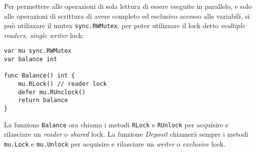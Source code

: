 Per permettere alle operazioni di sola lettura di essere eseguite in parallelo, e solo alle operazioni di scrittura di avere completo ed esclusivo accesso alle variabili, si può utilizzare il mutex \verb|sync.RWMutex|, per poter utilizzare il lock detto \textit{multiple readers, single writer} lock:
\begin{lstlisting}[frame=single, label={lst:lstlisting9-3.1}]
var mu sync.RWMutex
var balance int

func Balance() int {
    mu.RLock() // reader lock
    defer mu.RUnclock()
    return balance
}
\end{lstlisting}
La funzione \verb|Balance| ora chiama i metodi \verb|RLock| e \verb|RUnlock| per acquisire e rilasciare un \textit{reader} o \textit{shared} lock.
La funzione \textit{Deposit} chiamerà sempre i metodi \verb|mu.Lock| e \verb|mu.Unlock| per acquisire e rilasciare un \textit{writer} o \textit{exclusive} lock.